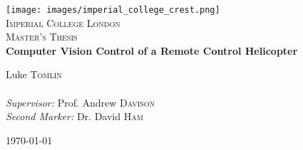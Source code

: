 \newcommand{\HRule}{\rule{\linewidth}{0.5mm}}

\begin{titlepage}
\begin{center}
\texttt{[image: images/imperial\_college\_crest.png]}\\[0.45cm]  
\textsc{\LARGE Imperial College London}\\[1cm]
\textsc{\Large Master's Thesis}\\[0.5cm]

\vspace{0.4cm}
{ \LARGE \bfseries Computer Vision Control of a Remote Control Helicopter}\\[0.4cm]
\vspace{1.5cm}

{Luke \textsc{Tomlin}} \\
\href{lt609@doc.ic.ac.uk CID:00592325} \\
\vspace{40pt}
\emph{Supervisor:} {Prof. Andrew \textsc{Davison}} \\
\emph{Second Marker:} {Dr. David \textsc{Ham}}
\vfill

{\large \today}
\end{center}
\end{titlepage}

\newpage{}
\thispagestyle{empty}
\mbox{}
